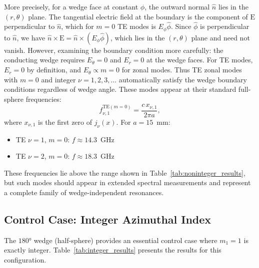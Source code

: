 \documentclass[
  aip,
  amsmath,amssymb,
  preprint
]{revtex4-1}
\begin{document}
More precisely, for a wedge face at constant $\phi$, the outward normal $\hat{n}$ lies in the $(r, \theta)$ plane. The tangential electric field at the boundary is the component of $\mathrm{E}$ perpendicular to $\hat{n}$, which for $m = 0$ TE modes is $E_\phi \hat{\phi}$. Since $\hat{\phi}$ is perpendicular to $\hat{n}$, we have $\hat{n} \times \mathrm{E} = \hat{n} \times (E_\phi \hat{\phi})$, which lies in the $(r, \theta)$ plane and need not vanish. However, examining the boundary condition more carefully: the conducting wedge requires $E_\theta = 0$ and $E_r = 0$ at the wedge faces. For TE modes, $E_r = 0$ by definition, and $E_\theta \propto m = 0$ for zonal modes. Thus TE zonal modes with $m = 0$ and integer $\nu = 1, 2, 3, \ldots$ automatically satisfy the wedge boundary conditions regardless of wedge angle. These modes appear at their standard full-sphere frequencies:
\begin{equation}
f_{\nu,1}^{\text{TE}(m=0)} = \frac{c \, x_{\nu,1}}{2\pi a},
\end{equation}
where $x_{\nu,1}$ is the first zero of $j_\nu(x)$. For $a = 15$~mm:
\begin{itemize}
\item TE $\nu = 1$, $m = 0$: $f \approx 14.3$~GHz
\item TE $\nu = 2$, $m = 0$: $f \approx 18.3$~GHz
\end{itemize}
These frequencies lie above the range shown in Table~\ref{tab:noninteger_results}, but such modes should appear in extended spectral measurements and represent a complete family of wedge-independent resonances.

\subsection{Control Case: Integer Azimuthal Index}

The $180°$ wedge (half-sphere) provides an essential control case where $m_1 = 1$ is exactly integer. Table~\ref{tab:integer_results} presents the results for this configuration.
\end{document}
